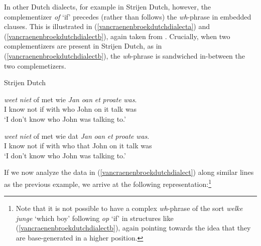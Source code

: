 
\noindent In other Dutch dialects, for example in Strijen Dutch, however, the complementizer \textit{of} `if' precedes (rather than follows) the \textit{wh}-phrase in embedded clauses. This is illustrated in (\ref{vancraenenbroekdutchdialecta}) and (\ref{vancraenenbroekdutchdialectb}), again taken from \citet[45--46]{van2012you}. Crucially, when two complementizers are present in Strijen Dutch, as in (\ref{vancraenenbroekdutchdialectb}), the \textit{wh}-phrase is sandwiched in-between the two complemetizers.


\begin{exe}
\ex Strijen Dutch \citep[45--46]{van2012you}\label{vancraenenbroekdutchdialect}\begin{xlist}
\ex {} {\textit{weet}} {\textit{niet}} {of} {met} {wie} {\textit{Jan}} {\textit{oan}} {\textit{et}} {\textit{proate}} {\textit{was}}.  \\
{I} {know} {not} {if} {with} {who} {John} {on} {it} {talk} {was} \\
\trans `I don't know who John was talking to.'  \label{vancraenenbroekdutchdialecta}

\ex {} {\textit{weet}} {\textit{niet}} {of} {met} {wie} {dat} {\textit{Jan}} {\textit{oan}} {\textit{et}} {\textit{proate}} {\textit{was}}.  \\
{I} {know} {not} {if} {with} {who} {that} {John} {on} {it} {talk} {was} \\
\trans `I don't know who John was talking to.'  \label{vancraenenbroekdutchdialectb}
\end{xlist}
\end{exe}

\noindent If we now analyze the data in (\ref{vancraenenbroekdutchdialect}) along similar lines as the previous example, we arrive at the following representation:\footnote{Note that it is not possible to have a complex \textit{wh}-phrase of the sort \textit{welke junge} `which boy' following \textit{op} `if' in structures like (\ref{vancraenenbroekdutchdialectb}), again pointing towards the idea that they are base-generated in a higher position.}





